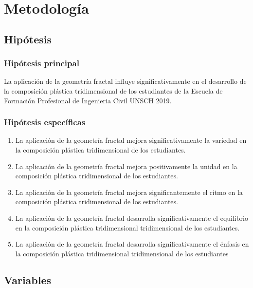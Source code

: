\documentclass[12pt,]{report}
\begin{document}
\hypertarget{ww}{%
\chapter{Metodología}\label{ww}}

\hypertarget{hipuxf3tesis}{%
\section{Hipótesis}\label{hipuxf3tesis}}

\hypertarget{hipuxf3tesis-principal}{%
\subsection{Hipótesis principal}\label{hipuxf3tesis-principal}}

La aplicación de la geometría fractal influye significativamente en el desarrollo de
la composición plástica tridimensional de los estudiantes de la Escuela de Formación
Profesional de Ingenieria Civil UNSCH 2019.

\hypertarget{hipuxf3tesis-especuxedficas}{%
\subsection{Hipótesis específicas}\label{hipuxf3tesis-especuxedficas}}

\begin{enumerate}
\def\labelenumi{\arabic{enumi}.}
\item
  La aplicación de la geometría fractal mejora significativamente la variedad en la
  composición plástica tridimensional de los estudiantes.
\item
  La aplicación de la geometría fractal mejora positivamente la unidad en la composición
  plástica tridimensional de los estudiantes.
\item
  La aplicación de la geometría fractal mejora significantemente el ritmo en la composición
  plástica tridimensional de los estudiantes.
\item
  La aplicación de la geometría fractal desarrolla significativamente el equilibrio en
  la composición plástica tridimensional tridimensional de los estudiantes.
\item
  La aplicación de la geometría fractal desarrolla significativamente el énfasis en la
  composición plástica tridimensional tridimensional de los estudiantes
\end{enumerate}

\hypertarget{variables}{%
\section{Variables}\label{variables}}
\end{document}

